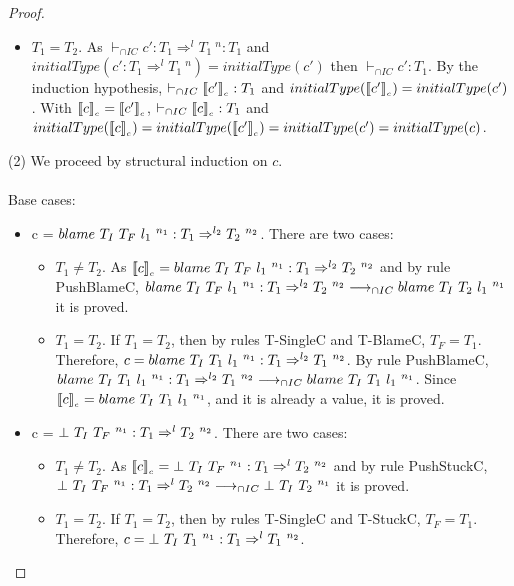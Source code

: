 \documentclass[a4paper]{article}
\begin{document}
\begin{proof}
\begin{itemize}
\begin{itemize}
        \item $T_1 = T_2$.
        As $\vdash_{\cap IC} c' : T_1 \Rightarrow^l T_1\ ^n : T_1$ and $initialType(c' : T_1 \Rightarrow^l T_1\ ^n) = initialType(c')$ then $\vdash_{\cap IC} c' : T_1$.
        By the induction hypothesis, $\vdash_{\cap IC} \llbracket c' \rrbracket_{_c} : T_1$ and $initialType(\llbracket c' \rrbracket_{_c}) = initialType(c')$.
        With $\llbracket c \rrbracket_{_c} = \llbracket c' \rrbracket_{_c}$, $\vdash_{\cap IC} \llbracket c \rrbracket_{_c} : T_1$ and $initialType(\llbracket c \rrbracket_{_c}) = initialType(\llbracket c' \rrbracket_{_c}) = initialType(c') = initialType(c)$.
    \end{itemize}
\end{itemize}
(2) We proceed by structural induction on $c$.\\\\
Base cases:
\begin{itemize}
    \item c = $blame\ T_I\ T_F\ l_1\ ^{n_1} : T_1 \Rightarrow^{l_2} T_2\ ^{n_2}$.
    There are two cases:
    \begin{itemize}
        \item $T_1 \neq T_2$.
        As $\erasec{c} = \blamecast{T_I}{T_F}{l_1}{n_1} : T_1 \Rightarrow^{l_2} T_2\ ^{n_2}$ and by rule PushBlameC, $blame\ T_I\ T_F\ l_1\ ^{n_1} : T_1 \Rightarrow^{l_2} T_2\ ^{n_2} \longrightarrow_{\cap IC} blame\ T_I\ T_2\ l_1\ ^{n_1}$ it is proved.
        \item $T_1 = T_2$.
        If $T_1 = T_2$, then by rules T-SingleC and T-BlameC, $T_F = T_1$.
        Therefore, $c = blame\ T_I\ T_1\ l_1\ ^{n_1} : T_1 \Rightarrow^{l_2} T_1\ ^{n_2}$.
        By rule PushBlameC, $blame\ T_I\ T_1\ l_1\ ^{n_1} : T_1 \Rightarrow^{l_2} T_1\ ^{n_2} \longrightarrow_{\cap IC} blame\ T_I\ T_1\ l_1\ ^{n_1}$.
        Since $\llbracket c \rrbracket_{_c} = blame\ T_I\ T_1\ l_1\ ^{n_1}$, and it is already a value, it is proved.
    \end{itemize}
    \item c = $\bot\ T_I\ T_F\ ^{n_1} : T_1 \Rightarrow^l T_2\ ^{n_2}$.
    There are two cases:
    \begin{itemize}
        \item $T_1 \neq T_2$.
        As $\llbracket c \rrbracket_{_c} = \bot\ T_I\ T_F\ ^{n_1} : T_1 \Rightarrow^l T_2\ ^{n_2}$ and by rule PushStuckC, $\stuckcast{T_I}{T_F}{n_1} : T_1 \Rightarrow^l T_2\ ^{n_2} \longrightarrow_{\cap IC} \stuckcast{T_I}{T_2}{n_1}$ it is proved.
        \item $T_1 = T_2$.
        If $T_1 = T_2$, then by rules T-SingleC and T-StuckC, $T_F = T_1$.
        Therefore, $c = \bot\ T_I\ T_1\ ^{n_1} : T_1 \Rightarrow^l T_1\ ^{n_2}$.

\end{itemize}
\end{itemize}
\end{proof}
\end{document}
